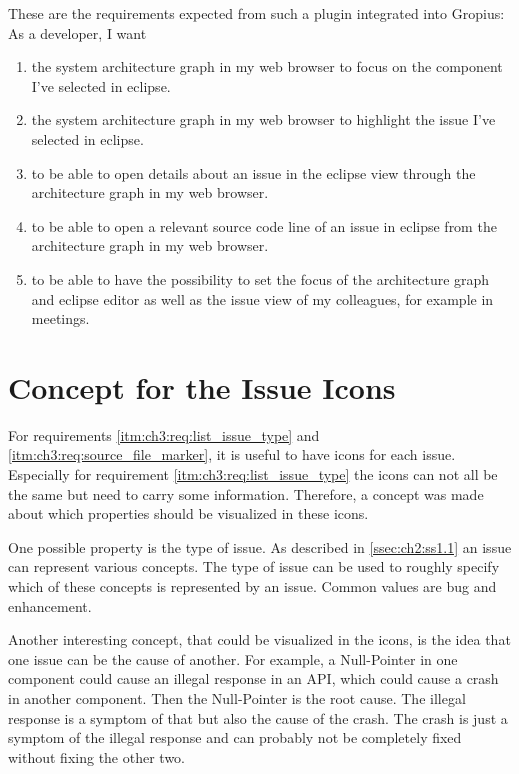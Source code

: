 These are the requirements expected from such a plugin integrated into \gls{Gropius}:
As a developer, I want
\begin{enumerate}
	\setcounter{enumi}{\value{enumarteCounter}} %
	\item the system architecture graph in my web browser to focus on the component I've selected in eclipse.
	\item the system architecture graph in my web browser to highlight the issue I've selected in eclipse.
	\item to be able to open details about an issue in the eclipse view through the architecture graph in my web browser.
	\item to be able to open a relevant source code line of an issue in eclipse from the architecture graph in my web browser.
	\item to be able to have the possibility to set the focus of the architecture graph and eclipse editor as well as the issue view of my colleagues, for example in meetings.
\end{enumerate}

\section{Concept for the Issue Icons}
\label{sec:ch3:s2}
For requirements \ref{itm:ch3:req:list_issue_type} and \ref{itm:ch3:req:source_file_marker}, it is useful to have icons for each issue.
Especially for requirement \ref{itm:ch3:req:list_issue_type} the icons can not all be the same but need to carry some information.
Therefore, a concept was made about which properties should be visualized in these icons.

One possible property is the type of issue.
As described in \cref{ssec:ch2:ss1.1} an issue can represent various concepts.
The type of issue can be used to roughly specify which of these concepts is represented by an issue.
Common values are bug and enhancement.

Another interesting concept, that could be visualized in the icons, is the idea that one issue can be the cause of another.
For example, a Null-Pointer in one component could cause an illegal response in an \gls{API}, which could cause a crash in another component.
Then the Null-Pointer is the root cause.
The illegal response is a symptom of that but also the cause of the crash.
The crash is just a symptom of the illegal response and can probably not be completely fixed without fixing the other two.


